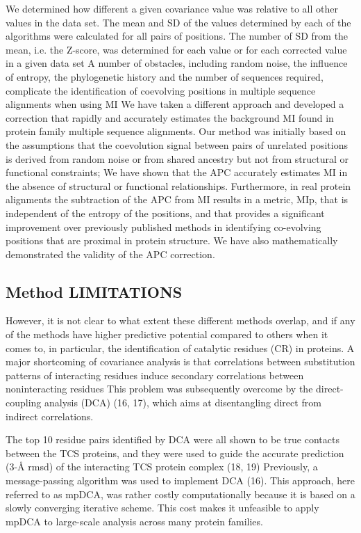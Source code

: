 We determined how different a given covariance value was relative to all other values in the data set. The mean and SD of the values determined by each of the algorithms were calculated for all pairs of positions. The number of SD from the mean, i.e. the Z-score, was determined for each value or for each corrected value in a given data set \cite{dunn2008mutual}
A number of obstacles, including random noise, the influence of entropy, the phylogenetic history and the number of sequences required, complicate the identification of coevolving positions in multiple sequence alignments when using MI \cite{dunn2008mutual}
We have taken a different approach and developed a correction that rapidly and accurately estimates the background MI found in protein family multiple sequence alignments. Our method was initially based on the assumptions that the coevolution signal between pairs of unrelated positions is derived from random noise or from shared ancestry but not from structural or functional constraints;  \cite{dunn2008mutual}
We have shown that the APC accurately estimates MI in the absence of structural or functional relationships. Furthermore, in real protein alignments the subtraction of the APC from MI results in a metric, MIp, that is independent of the entropy of the positions, and that provides a significant improvement over previously published methods in identifying co-evolving positions that are proximal in protein structure. \cite{dunn2008mutual}
We have also mathematically demonstrated the validity of the APC correction. \cite{dunn2008mutual}


\subsection{Method LIMITATIONS}
However, it is not clear to what extent these different methods overlap, and if any of the methods have higher predictive potential compared to others when it comes to, in particular, the identification of catalytic residues (CR) in proteins. \cite{teppa2012disentangling}
A major shortcoming of covariance analysis is that correlations between substitution patterns of interacting residues induce secondary correlations between noninteracting residues \cite{morcos2011direct}
This problem was subsequently overcome by the direct-coupling analysis (DCA) (16, 17), which aims at disentangling direct from indirect correlations.  \cite{morcos2011direct}

The top 10 residue pairs identified by DCA were all shown to be true contacts between the TCS proteins, and they were used to guide the accurate prediction (3-Å rmsd) of the interacting TCS protein complex (18, 19) \cite{morcos2011direct}
Previously, a message-passing algorithm was used to implement DCA (16). This approach, here referred to as mpDCA, was rather costly computationally because it is based on a slowly converging iterative scheme. This cost makes it unfeasible to apply mpDCA to large-scale analysis across many protein families. \cite{morcos2011direct}


